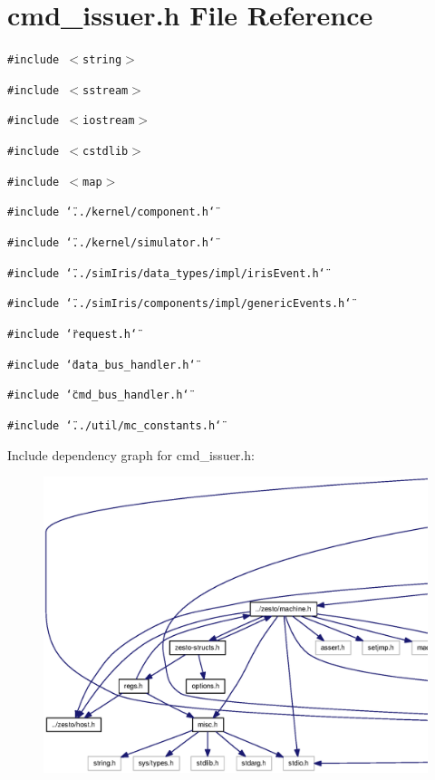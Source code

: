 \section{cmd\_\-issuer.h File Reference}
\label{cmd__issuer_8h}
{\tt \#include $<$string$>$}\par
{\tt \#include $<$sstream$>$}\par
{\tt \#include $<$iostream$>$}\par
{\tt \#include $<$cstdlib$>$}\par
{\tt \#include $<$map$>$}\par
{\tt \#include \char`\"{}../kernel/component.h\char`\"{}}\par
{\tt \#include \char`\"{}../kernel/simulator.h\char`\"{}}\par
{\tt \#include \char`\"{}../simIris/data\_\-types/impl/irisEvent.h\char`\"{}}\par
{\tt \#include \char`\"{}../simIris/components/impl/genericEvents.h\char`\"{}}\par
{\tt \#include \char`\"{}request.h\char`\"{}}\par
{\tt \#include \char`\"{}data\_\-bus\_\-handler.h\char`\"{}}\par
{\tt \#include \char`\"{}cmd\_\-bus\_\-handler.h\char`\"{}}\par
{\tt \#include \char`\"{}../util/mc\_\-constants.h\char`\"{}}\par


Include dependency graph for cmd\_\-issuer.h:\nopagebreak
\begin{figure}[H]
\begin{center}
\leavevmode
\includegraphics[width=420pt]{cmd__issuer_8h__incl}
\end{center}
\end{figure}


